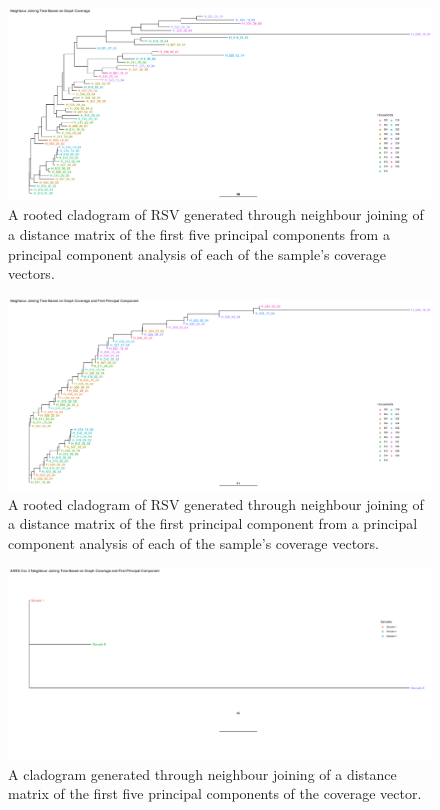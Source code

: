 \documentclass[10pt, a4paper]{article}
\begin{document}
\begin{landscape}
\begin{figure}
\centering
\includegraphics[width=1.0\textwidth]{../Figures/RSV/HH20_all_principal_components_nj_tree.png}
\caption[RSV PC1 cladogram]{\label{fig:org6ab841d}A rooted cladogram of RSV generated through neighbour joining of a distance matrix of the first five principal components from a principal component analysis of each of the sample’s coverage vectors.}
\end{figure}

\begin{figure}
\centering
\includegraphics[width=1.0\textwidth]{../Figures/RSV/HH20_first_principal_component_nj_tree.png}
\caption[RSV PC1 to PC5 cladogram]{\label{fig:orge3d3883}A rooted cladogram of RSV generated through neighbour joining of a distance matrix of the first principal component from a principal component analysis of each of the sample’s coverage vectors.}
\end{figure}

\begin{figure}
\centering
\includegraphics[width=1.0\textwidth]{../Figures/SARS_CoV_2/SARS_CoV_2_first_principal_component_nj_tree.png}
\caption[SARS-CoV-2 PC1 cladogram]{\label{fig:orgd547588}A cladogram generated through neighbour joining  of a distance matrix of the first five  principal components of the coverage vector.}
\end{figure}


\end{landscape}
\end{document}
